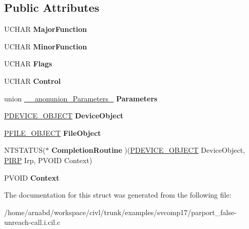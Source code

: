 \subsection*{Public Attributes}
\begin{DoxyCompactItemize}
\item 
\hypertarget{struct__IO__STACK__LOCATION_a0c4306fbe9b606b207130cd9555da08c}{}U\+C\+H\+A\+R {\bfseries Major\+Function}\label{struct__IO__STACK__LOCATION_a0c4306fbe9b606b207130cd9555da08c}

\item 
\hypertarget{struct__IO__STACK__LOCATION_aa32fbb850d1754853d85dbdefe85641c}{}U\+C\+H\+A\+R {\bfseries Minor\+Function}\label{struct__IO__STACK__LOCATION_aa32fbb850d1754853d85dbdefe85641c}

\item 
\hypertarget{struct__IO__STACK__LOCATION_aff051d905a4798d6db4a9f8d42621364}{}U\+C\+H\+A\+R {\bfseries Flags}\label{struct__IO__STACK__LOCATION_aff051d905a4798d6db4a9f8d42621364}

\item 
\hypertarget{struct__IO__STACK__LOCATION_ae1662d0c3a3a9e54fd1b1b68928e6750}{}U\+C\+H\+A\+R {\bfseries Control}\label{struct__IO__STACK__LOCATION_ae1662d0c3a3a9e54fd1b1b68928e6750}

\item 
\hypertarget{struct__IO__STACK__LOCATION_a10e483f001f31d21790be22b924241d5}{}union \hyperlink{union____anonunion__Parameters__55}{\+\_\+\+\_\+anonunion\+\_\+\+Parameters\+\_} {\bfseries Parameters}\label{struct__IO__STACK__LOCATION_a10e483f001f31d21790be22b924241d5}

\item 
\hypertarget{struct__IO__STACK__LOCATION_a606a825a411154ff5e6a07273fa741fe}{}\hyperlink{struct__DEVICE__OBJECT}{P\+D\+E\+V\+I\+C\+E\+\_\+\+O\+B\+J\+E\+C\+T} {\bfseries Device\+Object}\label{struct__IO__STACK__LOCATION_a606a825a411154ff5e6a07273fa741fe}

\item 
\hypertarget{struct__IO__STACK__LOCATION_a4c69bcda421d91cef28b3c625bedff3a}{}\hyperlink{struct__FILE__OBJECT}{P\+F\+I\+L\+E\+\_\+\+O\+B\+J\+E\+C\+T} {\bfseries File\+Object}\label{struct__IO__STACK__LOCATION_a4c69bcda421d91cef28b3c625bedff3a}

\item 
\hypertarget{struct__IO__STACK__LOCATION_acdd9d85f6456c75dce18ccd16c84223f}{}N\+T\+S\+T\+A\+T\+U\+S($\ast$ {\bfseries Completion\+Routine} )(\hyperlink{struct__DEVICE__OBJECT}{P\+D\+E\+V\+I\+C\+E\+\_\+\+O\+B\+J\+E\+C\+T} Device\+Object, \hyperlink{struct__IRP}{P\+I\+R\+P} Irp, P\+V\+O\+I\+D Context)\label{struct__IO__STACK__LOCATION_acdd9d85f6456c75dce18ccd16c84223f}

\item 
\hypertarget{struct__IO__STACK__LOCATION_a1fc52333091dae4d69d89d3277a4a60d}{}P\+V\+O\+I\+D {\bfseries Context}\label{struct__IO__STACK__LOCATION_a1fc52333091dae4d69d89d3277a4a60d}

\end{DoxyCompactItemize}


The documentation for this struct was generated from the following file\+:\begin{DoxyCompactItemize}
\item 
/home/arnabd/workspace/civl/trunk/examples/svcomp17/parport\+\_\+false-\/unreach-\/call.\+i.\+cil.\+c\end{DoxyCompactItemize}
